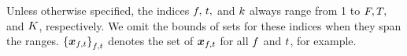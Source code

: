 \documentclass[sip,biber]{now-journal}
\begin{document}
Unless otherwise specified, the indices $f,\, t,$ and $k$ always range from 1 to $F, T,$ and $K$, respectively.
We omit the bounds of sets for these indices when they span the ranges.
${\{\Obs _{\ft}\}}_{\ft}$ denotes the set of $\Obs _{\ft}$ for all $f$ and $t$, for example.
\end{document}
